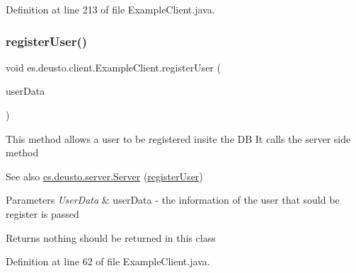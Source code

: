 Definition at line 213 of file Example\+Client.\+java.

\mbox{\label{classes_1_1deusto_1_1client_1_1_example_client_a1c17371c17dde2b7664f2ad17ee79e4b}} 
\subsubsection{\texorpdfstring{register\+User()}{registerUser()}}
{\footnotesize\ttfamily void es.\+deusto.\+client.\+Example\+Client.\+register\+User (\begin{DoxyParamCaption}\item[{\hyperlink{classes_1_1deusto_1_1serialization_1_1_user_data}{User\+Data}}]{user\+Data }\end{DoxyParamCaption})}

This method allows a user to be registered insite the DB It calls the server side method \begin{DoxySeeAlso}{See also}
\hyperlink{classes_1_1deusto_1_1server_1_1_server}{es.\+deusto.\+server.\+Server} (\hyperlink{classes_1_1deusto_1_1client_1_1_example_client_a1c17371c17dde2b7664f2ad17ee79e4b}{register\+User}) 
\end{DoxySeeAlso}

\begin{DoxyParams}{Parameters}
{\em User\+Data} & user\+Data -\/ the information of the user that sould be register is passed \\
\hline
\end{DoxyParams}
\begin{DoxyReturn}{Returns}
nothing should be returned in this class 
\end{DoxyReturn}


Definition at line 62 of file Example\+Client.\+java.

\mbox{\label{classes_1_1deusto_1_1client_1_1_example_client_ae2e3b42bf8ef3a646d92e2b308e38005}} 
